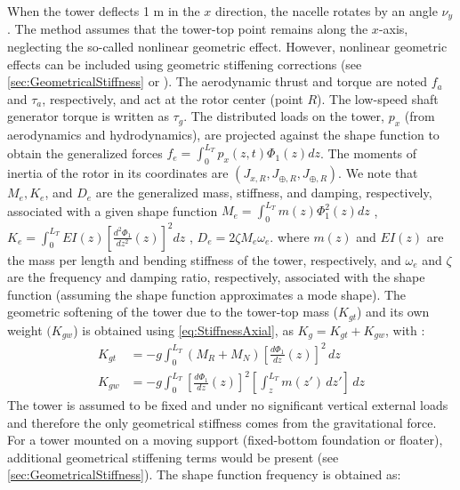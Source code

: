\documentclass[wes, manuscript]{copernicus}
\begin{document}
When the tower deflects 1 \unit{m} in the $x$ direction, the nacelle rotates by an angle $\nu_y$.
The method assumes that the tower-top point remains along the $x$-axis, neglecting the so-called nonlinear geometric effect.
However, nonlinear geometric effects can be included using geometric stiffening corrections (see  \autoref{sec:GeometricalStiffness} or \cite{branlard:2019flex}).
The aerodynamic thrust and torque are noted $f_a$ and $\tau_a$, respectively, and act at the rotor center (point $R$).
The low-speed shaft generator torque is written as $\tau_g$.
The distributed loads on the tower, $p_x$ (from aerodynamics and hydrodynamics), are projected against the shape function to obtain the generalized forces 
  $f_e=\int_0^{L_T} p_x(z,t)\Phi_1(z) dz $.
The moments of inertia of the rotor in its coordinates are $(J_{x,R}, J_{\oplus,R}, J_{\oplus,R})$.
We note that $M_e, K_e$, and $D_e$ are the generalized mass, stiffness, and damping, respectively, associated with a given shape function
$M_e=\int_0^{L_T} m(z) \Phi_1^2(z) dz$
    ,
  $K_e=\int_0^{L_T} EI(z) \left[\frac{d^2\Phi_1}{dz^2}(z)\right]^2 dz$
,
    $D_e= 2 \zeta M_e \omega_e$.
where $m(z)$ and $EI(z)$ are the mass per length and bending stiffness of the tower, respectively, and $\omega_e$  and $\zeta$ are the frequency and damping ratio, respectively, associated with the shape function (assuming the shape function approximates a mode shape).
The geometric softening of the tower due to the tower-top mass ($K_{gt}$) and its own weight $(K_{gw}$) is obtained using \autoref{eq:StiffnessAxial}, as $K_g= K_{gt}+K_{gw}$, with :
\begin{align}
  K_{gt}&=- g \int_0^{L_T} (M_{R}+M_N)\left[\frac{d\Phi_1}{dz}(z)\right]^2\, dz
     \\
  K_{gw}&=- g \int_0^{L_T} \left[\frac{d\Phi_1}{dz}(z)\right]^2 \left[\int_z^{L_T} m(z')\,dz' \right]  \, dz
\end{align}
The tower is assumed to be fixed and under no significant vertical external loads and therefore the only geometrical stiffness comes from the gravitational force. For a tower mounted on a moving support (fixed-bottom foundation or floater), additional  geometrical stiffening terms would be present (see \autoref{sec:GeometricalStiffness}).
% 
The shape function frequency is obtained as:
\end{document}
